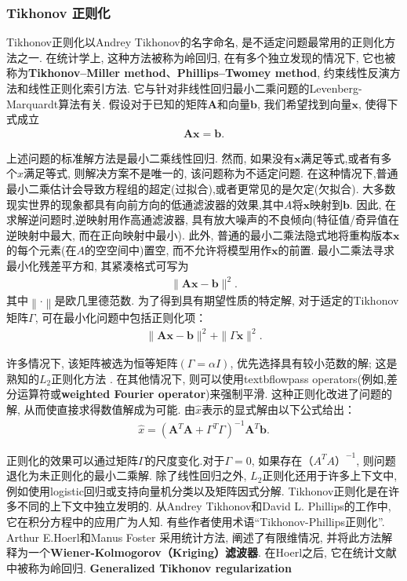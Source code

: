\subsubsection{Tikhonov 正则化}
Tikhonov正则化以Andrey Tikhonov的名字命名, 是不适定问题最常用的正则化方法之一.
在统计学上, 这种方法被称为岭回归, 在有多个独立发现的情况下, 它也被称为\textbf{Tikhonov–Miller method}、\textbf{Phillips–Twomey method}, 约束线性反演方法和线性正则化索引方法.
它与针对非线性回归最小二乘问题的Levenberg-Marquardt算法有关.
假设对于已知的矩阵$\bm A$和向量$\bm b$, 我们希望找到向量$\bm{x}$, 使得下式成立
\begin{align}
   \bm A\bm {x} =\bm {b}.
\end{align}

上述问题的标准解方法是最小二乘线性回归. 然而, 如果没有$\bm x$满足等式,或者有多个$\displaystyle x$满足等式, 则解决方案不是唯一的, 该问题称为不适定问题.
在这种情况下,普通最小二乘估计会导致方程组的超定(过拟合),或者更常见的是欠定(欠拟合).
大多数现实世界的现象都具有向前方向的低通滤波器的效果,其中$A$将$\bm{x}$映射到$\bm{b}$.
因此, 在求解逆问题时,逆映射用作高通滤波器, 具有放大噪声的不良倾向(特征值/奇异值在逆映射中最大, 而在正向映射中最小).
此外, 普通的最小二乘法隐式地将重构版本$\bm{x}$的每个元素(在$A$的空空间中)置空, 而不允许将模型用作$\bm{x}$的前置.
最小二乘法寻求最小化残差平方和, 其紧凑格式可写为
\begin{align}
   \|\bm A\bm {x} -\bm {b} \|^{2}.
\end{align}
其中$\left\|\cdot\right\|$是欧几里德范数. 为了得到具有期望性质的特定解, 对于适定的Tikhonov矩阵$\Gamma$, 可在最小化问题中包括正则化项：
\begin{align}
  \|\bm A\bm {x} -\bm {b} \|^{2}+\|\Gamma \bm {x} \|^{2}.
\end{align}

许多情况下, 该矩阵被选为恒等矩阵$(\Gamma=\alpha I)$, 优先选择具有较小范数的解; 这是熟知的$L_2$正则化方法 \cite{Ng2004-32636}.
在其他情况下, 则可以使用textbf{lowpass operators}(例如,差分运算符或\textbf{weighted Fourier operator})来强制平滑.
这种正则化改进了问题的解, 从而使直接求得数值解成为可能. 由$\hat{x}$表示的显式解由以下公式给出：
\begin{align}
  {\hat {x}}=(\bm A^{T}\bm A+\Gamma ^{T}\Gamma )^{-1}\bm A^{T}\bm {b}.
\end{align}

正则化的效果可以通过矩阵$\Gamma$的尺度变化.对于$\Gamma=0$, 如果存在$（A^TA）^{-1}$, 则问题退化为未正则化的最小二乘解.
除了线性回归之外, $L_2$正则化还用于许多上下文中, 例如使用logistic回归或支持向量机分类\cite{Fan2008LIBLINEAR}以及矩阵因式分解\cite{Guan2012Online}.
Tikhonov正则化是在许多不同的上下文中独立发明的. 从Andrey Tikhonov和David L. Phillips的工作中, 它在积分方程中的应用广为人知.
有些作者使用术语“Tikhonov-Phillips正则化”. Arthur E.Hoerl和Manus Foster 采用统计方法, 阐述了有限维情况, 并将此方法解释为一个\textbf{Wiener-Kolmogorov（Kriging）滤波器}.
在Hoerl之后, 它在统计文献中被称为岭回归. \textbf{Generalized Tikhonov regularization}

